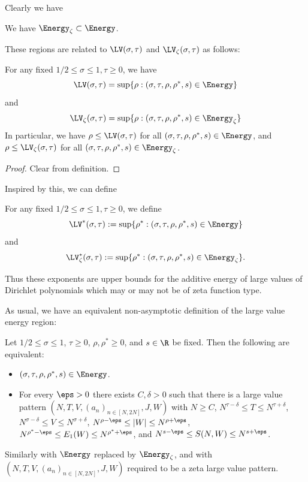 Clearly we have

\begin{lemma}\label{triv-contain} We have $\Energy_\zeta \subset \Energy$.
\end{lemma}

These regions are related to $\LV(\sigma,\tau)$ and $\LV_{\zeta}(\sigma,\tau)$ as follows:

\begin{lemma}\label{energy-region-lv} For any fixed $1/2 \leq \sigma \leq 1, \tau \geq 0$, we have
$$ \LV(\sigma,\tau) = \sup \{ \rho: (\sigma,\tau,\rho,\rho^*,s) \in \Energy\}$$
and
$$ \LV_\zeta(\sigma,\tau) = \sup \{ \rho: (\sigma,\tau,\rho,\rho^*,s) \in \Energy_\zeta\}$$
In particular, we have $\rho \leq \LV(\sigma,\tau)$ for all $(\sigma,\tau,\rho,\rho^*,s) \in \Energy$, and $\rho \leq \LV_\zeta(\sigma,\tau)$ for all $(\sigma,\tau,\rho,\rho^*,s) \in \Energy_\zeta$.
\end{lemma}

\begin{proof} Clear from definition.
\end{proof}

Inspired by this, we can define

\begin{definition}\label{lvze-def}  For any fixed $1/2 \leq \sigma \leq 1, \tau \geq 0$, we define
$$ \LV^*(\sigma,\tau) := \sup \{ \rho^*: (\sigma,\tau,\rho,\rho^*,s) \in \Energy\}$$
and
$$ \LV^*_\zeta(\sigma,\tau) := \sup \{ \rho^*: (\sigma,\tau,\rho,\rho^*,s) \in \Energy_\zeta\}.$$
\end{definition}

Thus these exponents are upper bounds for the additive energy of large values of Dirichlet polynomials which may or may not be of zeta function type.

As usual, we have an equivalent non-asymptotic definition of the large value energy region:

\begin{lemma}\label{lve-asymp} Let $1/2 \leq \sigma \leq 1$, $\tau \geq 0$,  $\rho, \rho^* \geq 0$, and $s \in \R$ be fixed.  Then the following are equivalent:
    \begin{itemize}
    \item[(i)] $(\sigma,\tau,\rho,\rho^*,s) \in \Energy$.
    \item[(ii)] For every $\eps>0$ there exists $C, \delta > 0$ such that there is a large value pattern $(N,T,V,(a_n)_{n \in [N,2N]},J,W)$ with $N \geq C$, $N^{\tau-\delta} \leq T \leq N^{\tau+\delta}$, $N^{\sigma-\delta} \leq V \leq N^{\sigma+\delta}$,
    $N^{\rho-\eps} \leq |W| \leq N^{\rho+\eps}$,
    $N^{\rho^*-\eps} \leq E_1(W) \leq N^{\rho^*+\eps}$, and
    $N^{s-\eps} \leq S(N, W) \leq N^{s+\eps}$.
    \end{itemize}
    Similarly with $\Energy$ replaced by $\Energy_\zeta$, and with $(N,T,V,(a_n)_{n \in [N,2N]},J,W)$ required to be a zeta large value pattern.
\end{lemma}

